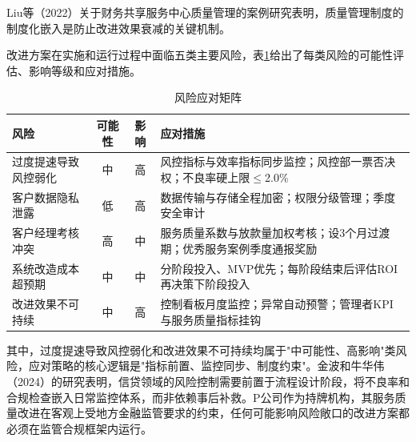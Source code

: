 Liu等（2022）关于财务共享服务中心质量管理的案例研究表明，质量管理制度的制度化嵌入是防止改进效果衰减的关键机制\cite{ref78}。

改进方案在实施和运行过程中面临五类主要风险，表\ref{tab:6-5}给出了每类风险的可能性评估、影响等级和应对措施。

\begin{table}[htbp]
  \centering
  \small
  \caption{风险应对矩阵}
  \label{tab:6-5}
  \begin{tabularx}{\textwidth}{l c c X}
    \toprule
    \textbf{风险} & \textbf{可能性} & \textbf{影响} & \textbf{应对措施} \\
    \midrule
    过度提速导致风控弱化 & 中 & 高 & 风控指标与效率指标同步监控；风控部一票否决权；不良率硬上限$\leq$2.0\% \\
    客户数据隐私泄露 & 低 & 高 & 数据传输与存储全程加密；权限分级管理；季度安全审计 \\
    客户经理考核冲突 & 高 & 中 & 服务质量系数与放款量加权考核；设3个月过渡期；优秀服务案例季度通报奖励 \\
    系统改造成本超预期 & 中 & 中 & 分阶段投入、MVP优先；每阶段结束后评估ROI再决策下阶段投入 \\
    改进效果不可持续 & 中 & 高 & 控制看板月度监控；异常自动预警；管理者KPI与服务质量指标挂钩 \\
    \bottomrule
  \end{tabularx}
\end{table}

其中，过度提速导致风控弱化和改进效果不可持续均属于"中可能性、高影响"类风险，应对策略的核心逻辑是"指标前置、监控同步、制度约束"。金波和牛华伟（2024）的研究表明，信贷领域的风险控制需要前置于流程设计阶段，将不良率和合规检查嵌入日常监控体系，而非依赖事后补救\cite{ref71}。P公司作为持牌机构，其服务质量改进在客观上受地方金融监管要求的约束，任何可能影响风险敞口的改进方案都必须在监管合规框架内运行\cite{ref73}。

